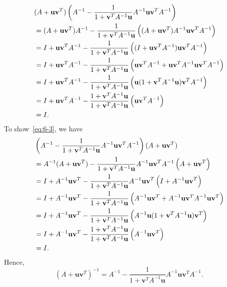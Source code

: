 \documentclass{article}
\def\*#1{\mathbf{#1}}
\begin{document}
\begin{align*}
    &(A + \*u \*v^T) \del{A^{-1} - \frac{1}{1 + \*v^T A^{-1} \*u} A^{-1} \*u \*v^T A^{-1}} \\
    &= (A + \*u \*v^T) A^{-1}
        - \frac{1}{1 + \*v^T A^{-1} \*u}
            \del{
                (A + \*u \*v^T) A^{-1} \*u \*v^T A^{-1}
            }
        \\
    &= I + \*u \*v^T A^{-1}
        - \frac{1}{1 + \*v^T A^{-1} \*u}
            \del{
                (I + \*u \*v^T A^{-1}) \*u \*v^T A^{-1}
            }
        \\
    &= I + \*u \*v^T A^{-1}
        - \frac{1}{1 + \*v^T A^{-1} \*u}
            \del{
                \*u \*v^T A^{-1} + \*u \*v^T A^{-1} \*u \*v^T A^{-1}
            }
        \\
    &= I + \*u \*v^T A^{-1}
        - \frac{1}{1 + \*v^T A^{-1} \*u}
            \del{
                \*u (1 + \*v^T A^{-1} \*u) \*v^T A^{-1}
            }
        \\
    &= I + \*u \*v^T A^{-1}
        - \frac{1 + \*v^T A^{-1} \*u}{1 + \*v^T A^{-1} \*u}
            \del{
                \*u \*v^T A^{-1}
            }
        \\
    &= I
    .
\end{align*}
%
To show~\eqref{eq:6-3}, we have
%
\begin{align*}
    &\del{A^{-1} - \frac{1}{1 + \*v^T A^{-1} \*u} A^{-1} \*u \*v^T A^{-1}} (A + \*u \*v^T) \\
    &=  A^{-1} (A + \*u \*v^T)
        - \frac{1}{1 + \*v^T A^{-1} \*u} A^{-1} \*u \*v^T A^{-1}
            \del{
            A
            + \*u \*v^T
            }
        \\
    &=  I + A^{-1} \*u \*v^T
        - \frac{1}{1 + \*v^T A^{-1} \*u} A^{-1} \*u \*v^T
            \del{
            I
            + A^{-1} \*u \*v^T
            }
        \\
    &=  I + A^{-1} \*u \*v^T
        - \frac{1}{1 + \*v^T A^{-1} \*u}
            \del{
            A^{-1} \*u \*v^T
            +
            A^{-1} \*u \*v^T
            A^{-1} \*u \*v^T
            }
        \\
    &=  I + A^{-1} \*u \*v^T
        - \frac{1}{1 + \*v^T A^{-1} \*u}
            \del{
                A^{-1} \*u (1 + \*v^T A^{-1} \*u) \*v^T
            }
        \\
    &=  I + A^{-1} \*u \*v^T
        - \frac{1 + \*v^T A^{-1} \*u}{1 + \*v^T A^{-1} \*u}
            \del{
                A^{-1} \*u \*v^T
            }
        \\
    &= I
    .
\end{align*}
%
Hence,
%
\begin{equation*}
    (A + \*u \*v^T)^{-1} = A^{-1} - \frac{1}{1 + \*v^T A^{-1} \*u} A^{-1} \*u \*v^T A^{-1}.
\end{equation*}
\end{document}
